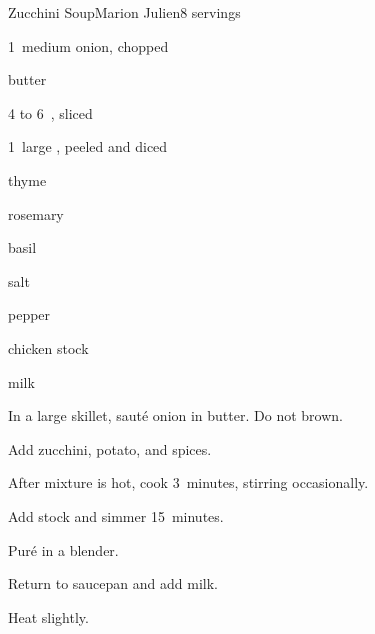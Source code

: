 \begin{recipe}{Zucchini Soup\UNTESTED}{Marion Julien}{8 servings}

\begin{ingredients}
\item 1~medium onion, chopped
\item {} butter
\item 4 to 6~, sliced
\item 1~large , peeled and diced
\item \tp{\quarter} thyme
\item \tp{\quarter} rosemary
\item \tp{\quarter} basil
\item \tp{\quarter} salt
\item pepper
\item {} chicken stock
\item {} milk
\end{ingredients}

\begin{directions}
\item In a large skillet, saut\'e onion in butter. Do not brown.
\item Add zucchini, potato, and spices.
\item After mixture is hot, cook 3~minutes, stirring occasionally.
\item Add stock and simmer 15~minutes.
\item Pur\'e in a blender.
\item Return to saucepan and add milk.
\item Heat slightly.
\end{directions}

\end{recipe}
